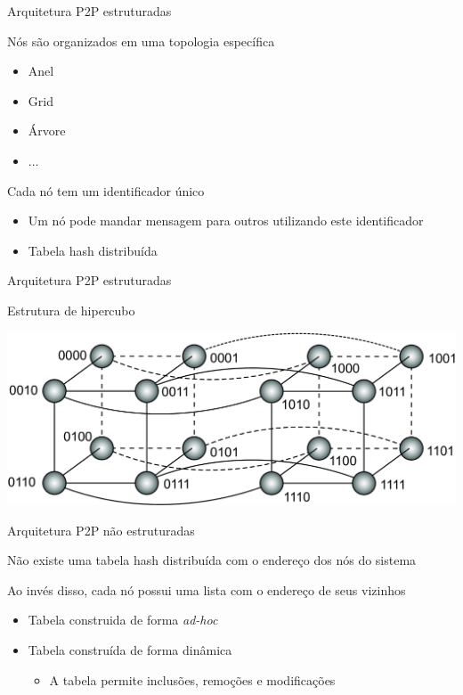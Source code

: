 \documentclass[compress]{beamer}
\begin{document}

\begin{frame}{Arquitetura P2P estruturadas}

Nós são organizados em uma topologia específica
\begin{itemize}
    \item Anel
    \item Grid
    \item Árvore
    \item $\ldots$
\end{itemize}

Cada nó tem um identificador único
\begin{itemize}
    \item Um nó pode mandar mensagem para outros utilizando este identificador
    \item Tabela hash distribuída
\end{itemize}
\end{frame}


\begin{frame}{Arquitetura P2P estruturadas}

\centering Estrutura de hipercubo

\vspace{1cm}

\centering \includegraphics[width=\textwidth]{images/hypercube.png}
\end{frame}


\begin{frame}{Arquitetura P2P não estruturadas}

Não existe uma tabela hash distribuída com o endereço dos nós do sistema

\vspace{1cm}

Ao invés disso, cada nó possui uma lista com o endereço de seus vizinhos
\begin{itemize}
    \item Tabela construida de forma \textit{ad-hoc}
    \item Tabela construída de forma dinâmica
    \begin{itemize}
        \item A tabela permite inclusões, remoções e modificações
    \end{itemize}
\end{itemize}

\end{frame}
\end{document}

